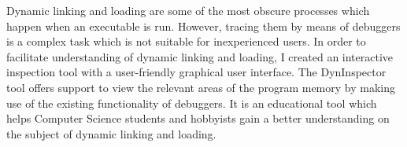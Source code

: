 Dynamic linking and loading are some of the most obscure processes which happen when an executable is run. However, tracing them by means of debuggers is a complex task which is not suitable for inexperienced users. In order to facilitate understanding of dynamic linking and loading, I created an interactive inspection tool with a user-friendly graphical user interface. The DynInspector tool offers support to view the relevant areas of the program memory by making use of the existing functionality of debuggers. It is an educational tool which helps Computer Science students and hobbyists gain a better understanding on the subject of dynamic linking and loading.